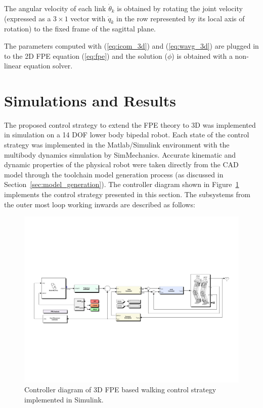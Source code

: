 The angular velocity of each link ${\dot{\theta}_k}$ is obtained by rotating the joint velocity (expressed as a $3\times1$ vector with $\dot{q}_k$ in the row represented by its local axis of rotation) to the fixed frame of the sagittal plane. 

The parameters computed with (\ref{eq:icom_3d}) and (\ref{eq:wavg_3d}) are plugged in to the 2D FPE equation (\ref{eq:fpe}) and the solution ($\phi$) is obtained with a non-linear equation solver. 


\section{Simulations and Results} %
\label{sec:simulations_and_results}

The proposed control strategy to extend the FPE theory to 3D was implemented in simulation on a 14 DOF lower body bipedal robot. Each state of the control strategy was implemented in the Matlab/Simulink environment with the multibody dynamics simulation by SimMechanics. Accurate kinematic and dynamic properties of the physical robot were taken directly from the CAD model through the toolchain model generation process (as discussed in Section~\ref{sec:model_generation}). The controller diagram shown in Figure~\ref{fig:fpecontroller} implements the control strategy presented in this section. The subsystems from the outer most loop working inwards are described as follows: 

\begin{figure}[!b]
    \centerline{\includegraphics[trim = 12mm 75mm 12mm 75mm,clip,width=18cm]{fig/simulations/fpecontroller.pdf}}
  	\caption{Controller diagram of 3D FPE based walking control strategy implemented in Simulink.}
	\label{fig:fpecontroller}
\end{figure}

